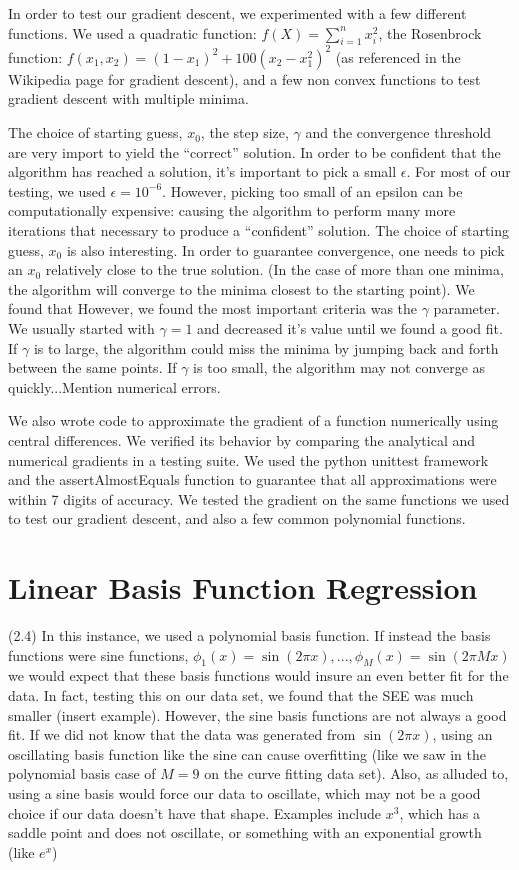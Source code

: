 \documentclass{article}
\begin{document}
In order to test our gradient descent, we experimented with a few different functions.  We used a quadratic function: $f(X) = \sum_{i=1}^n x_i^2$, the Rosenbrock function: $f(x_1,x_2) = (1-x_1)^2+100(x_2-x_1^2)^2$ (as referenced in the Wikipedia page for gradient descent), and a few non convex functions to test gradient descent with multiple minima.  

The choice of starting guess, $x_0$, the step size, $\gamma$ and the convergence threshold are very import to yield the ``correct'' solution.  In order to be confident that the algorithm has reached a solution, it's important to pick a small $\epsilon$.  For most of our testing, we used $\epsilon = 10^{-6}$.  However, picking too small of an epsilon can be computationally expensive: causing the algorithm to perform many more iterations that necessary to produce a ``confident'' solution.  The choice of starting guess, $x_0$ is also interesting.  In order to guarantee convergence, one needs to pick an $x_0$ relatively close to the true solution.  (In the case of more than one minima, the algorithm will converge to the minima closest to the starting point).  We found that However, we found the most important criteria was the $\gamma$ parameter.  We usually started with $\gamma=1$ and decreased it's value until we found a good fit.  If $\gamma$ is to large, the algorithm could miss the minima by jumping back and forth between the same points.  If $\gamma$ is too small, the algorithm may not converge as quickly...Mention numerical errors.  

We also wrote code to approximate the gradient of a function numerically using central differences.  We verified its behavior by comparing the analytical and numerical gradients in a testing suite.  We used the python unittest framework and the assertAlmostEquals function to guarantee that all approximations were within 7 digits of accuracy.  We tested the gradient on the same functions we used to test our gradient descent, and also a few common polynomial functions. 



\section{Linear Basis Function Regression}

(2.4) In this instance, we used a polynomial basis function.  If instead the basis functions were sine functions, $\phi_1(x)=\sin(2\pi x),...,\phi_M(x)=\sin(2\pi Mx)$ we would expect that these basis functions would insure an even better fit for the data.  In fact, testing this on our data set, we found that the SEE was much smaller (insert example).  However, the sine basis functions are not always a good fit.  If we did not know that the data was generated from $\sin(2\pi x)$, using an oscillating basis function like the sine can cause overfitting (like we saw in the polynomial basis case of $M=9$ on the curve fitting data set).  Also, as alluded to, using a sine basis would force our data to oscillate, which may not be a good choice if our data doesn't have that shape.  Examples include $x^3$, which has a saddle point and does not oscillate, or something with an exponential growth (like $e^x$)
\end{document}
